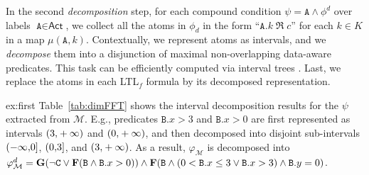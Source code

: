 In the second \textit{decomposition} step, for each compound condition $\psi=\texttt{A}\wedge \phi^d$ over labels $\texttt{A}\in\textsf{Act}$, we collect all the atoms in $\phi_d$ in the form ``$\texttt{A}.k\;\Re\; c$'' for each $k\in K$ in a map $\mu(\texttt{A},k)$. Contextually, we represent atoms as intervals, and we \textit{decompose} them
%
%
%
%
%
%
%
into a disjunction of maximal non-overlapping data-aware predicates. This task can be efficiently computed via interval trees \cite{inttree}. Last, we replace the atoms in each LTL$_f$ formula by its decomposed representation.%
\begin{continueexample}{ex:first}\label{ex:second}
Table~\ref{tab:dimFFT} shows the interval decomposition results for the $\psi$ extracted from $\mathcal{M}$. E.g., predicates $\texttt{B}.x>3$ and $\texttt{B}.x>0$ are first represented as intervals $\interval({3,+\infty})$ and $\interval({0,+\infty})$, and then decomposed into disjoint sub-intervals $\interval({-\infty,0}]$, $\interval({0,3}]$, and $\interval({3,+\infty})$. As a result, $\varphi_{\mathcal{M}}$ is decomposed into $\varphi_{\mathcal{M}}^d=\mathbf{G}(\neg\texttt{C}\vee \mathbf{F}(\texttt{B}\wedge \texttt{B}.x>0))\wedge \mathbf{F}(\texttt{B}\wedge (0<\texttt{B}.x\leq 3\vee \texttt{B}.x> 3) \wedge \texttt{B}.y=0)$.
\end{continueexample}

